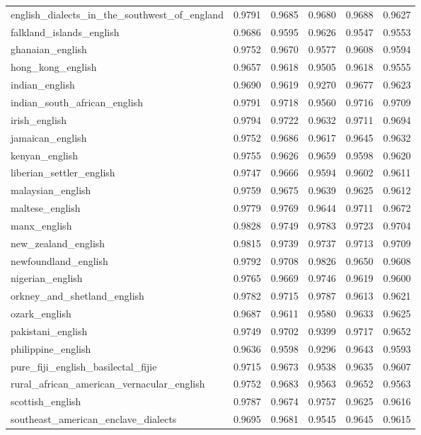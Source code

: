 \begin{longtable}{lccccc}
english\_dialects\_in\_the\_southwest\_of\_england & 0.9791 & 0.9685 & 0.9680 & 0.9688 & 0.9627 \\
falkland\_islands\_english & 0.9686 & 0.9595 & 0.9626 & 0.9547 & 0.9553 \\
ghanaian\_english & 0.9752 & 0.9670 & 0.9577 & 0.9608 & 0.9594 \\
hong\_kong\_english & 0.9657 & 0.9618 & 0.9505 & 0.9618 & 0.9555 \\
indian\_english & 0.9690 & 0.9619 & 0.9270 & 0.9677 & 0.9623 \\
indian\_south\_african\_english & 0.9791 & 0.9718 & 0.9560 & 0.9716 & 0.9709 \\
irish\_english & 0.9794 & 0.9722 & 0.9632 & 0.9711 & 0.9694 \\
jamaican\_english & 0.9752 & 0.9686 & 0.9617 & 0.9645 & 0.9632 \\
kenyan\_english & 0.9755 & 0.9626 & 0.9659 & 0.9598 & 0.9620 \\
liberian\_settler\_english & 0.9747 & 0.9666 & 0.9594 & 0.9602 & 0.9611 \\
malaysian\_english & 0.9759 & 0.9675 & 0.9639 & 0.9625 & 0.9612 \\
maltese\_english & 0.9779 & 0.9769 & 0.9644 & 0.9711 & 0.9672 \\
manx\_english & 0.9828 & 0.9749 & 0.9783 & 0.9723 & 0.9704 \\
new\_zealand\_english & 0.9815 & 0.9739 & 0.9737 & 0.9713 & 0.9709 \\
newfoundland\_english & 0.9792 & 0.9708 & 0.9826 & 0.9650 & 0.9608 \\
nigerian\_english & 0.9765 & 0.9669 & 0.9746 & 0.9619 & 0.9600 \\
orkney\_and\_shetland\_english & 0.9782 & 0.9715 & 0.9787 & 0.9613 & 0.9621 \\
ozark\_english & 0.9687 & 0.9611 & 0.9580 & 0.9633 & 0.9625 \\
pakistani\_english & 0.9749 & 0.9702 & 0.9399 & 0.9717 & 0.9652 \\
philippine\_english & 0.9636 & 0.9598 & 0.9296 & 0.9643 & 0.9593 \\
pure\_fiji\_english\_basilectal\_fijie & 0.9715 & 0.9673 & 0.9538 & 0.9635 & 0.9607 \\
rural\_african\_american\_vernacular\_english & 0.9752 & 0.9683 & 0.9563 & 0.9652 & 0.9563 \\
scottish\_english & 0.9787 & 0.9674 & 0.9757 & 0.9625 & 0.9616 \\
southeast\_american\_enclave\_dialects & 0.9695 & 0.9681 & 0.9545 & 0.9645 & 0.9615 \\

\end{longtable}
